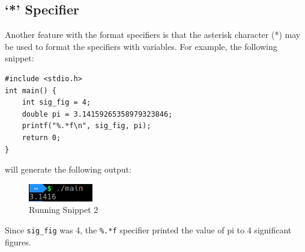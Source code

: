 \documentclass[paper=usletter, fontsize=12pt]{extarticle}
\begin{document}
    \subsection{`*' Specifier}

    Another feature with the format specifiers is that the asterisk character
    (*) may be used to format the specifiers with variables. For example, the
    following snippet:

\begin{lstlisting}
#include <stdio.h>
int main() {
    int sig_fig = 4;
    double pi = 3.14159265358979323846;
    printf("%.*f\n", sig_fig, pi);
    return 0;
}
\end{lstlisting}

    will generate the following output:

    \begin{figure}[ht]
        \begin{center}
            \includegraphics[width=0.25\textwidth]{build2.png}
            \caption{Running Snippet 2} \label{fig:build2}
        \end{center}
    \end{figure}

    Since \texttt{sig\_fig} was 4, the \texttt{\%.*f} specifier printed the
    value of pi to 4 significant figures.
\end{document}
